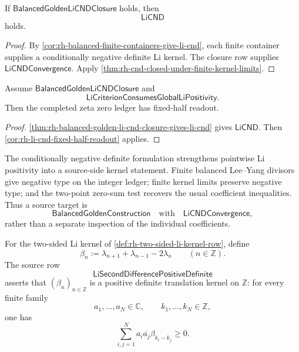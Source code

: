 \begin{theorem}
\label{thm:rh-balanced-golden-li-cnd-closure-gives-li-cnd}
If $\mathsf{BalancedGoldenLiCNDClosure}$ holds, then
$$
\mathsf{LiCND}
$$
holds.
\end{theorem}

\begin{proof}
By
\autoref{cor:rh-balanced-finite-containers-give-li-cnd}, each finite
container supplies a conditionally negative definite Li kernel.  The
closure row supplies $\mathsf{LiCNDConvergence}$.  Apply
\autoref{thm:rh-cnd-closed-under-finite-kernel-limits}.
\end{proof}

\begin{corollary}
\label{cor:rh-balanced-golden-li-cnd-closure-fixed-half-readout}
Assume $\mathsf{BalancedGoldenLiCNDClosure}$ and
$$
\mathsf{LiCriterionConsumesGlobalLiPositivity}.
$$
Then the completed zeta zero ledger has fixed-half readout.
\end{corollary}

\begin{proof}
\autoref{thm:rh-balanced-golden-li-cnd-closure-gives-li-cnd}
gives $\mathsf{LiCND}$.  Then
\autoref{cor:rh-li-cnd-fixed-half-readout} applies.
\end{proof}

\begin{principle}
\label{prin:rh-cnd-closure-as-li-weil-source-positivity}
The conditionally negative definite formulation strengthens pointwise Li
positivity into a source-side kernel statement.  Finite balanced
Lee--Yang divisors give negative type on the integer ledger; finite
kernel limits preserve negative type; and the two-point zero-sum test
recovers the usual coefficient inequalities.  Thus a source target is
$$
\mathsf{BalancedGoldenConstruction}
\quad
\text{with}
\quad
\mathsf{LiCNDConvergence},
$$
rather than a separate inspection of the individual coefficients.
\end{principle}

\begin{definition}
\label{def:rh-li-second-difference-kernel}
For the two-sided Li kernel of
\autoref{def:rh-two-sided-li-kernel-row}, define
$$
\beta_n
:=
\lambda_{n+1}+\lambda_{n-1}-2\lambda_n
\qquad
(n\in\mathbb Z).
$$
The source row
$$
\mathsf{LiSecondDifferencePositiveDefinite}
$$
asserts that $(\beta_n)_{n\in\mathbb Z}$ is a positive definite
translation kernel on $\mathbb Z$: for every finite family
$$
a_1,\ldots,a_N\in\mathbb C,
\qquad
k_1,\ldots,k_N\in\mathbb Z,
$$
one has
$$
\sum_{i,j=1}^N
a_i\overline{a_j}\beta_{k_i-k_j}
\ge0.
$$
\end{definition}

